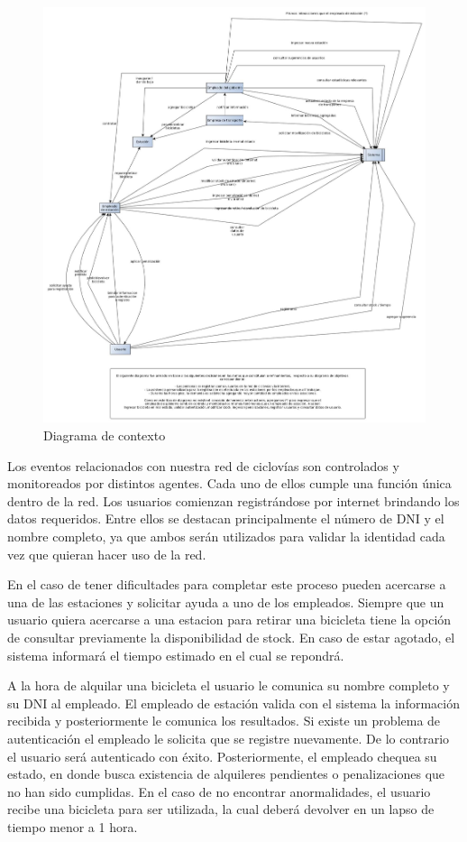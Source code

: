 \begin{figure}[H]
	\begin{center}
		  \includegraphics[scale=0.35]{diagrama_contexto.jpg}
		  \caption{Diagrama de contexto}
		  \label{fig:contra1}
	\end{center}
\end{figure}

Los eventos relacionados con nuestra red de ciclovías son controlados y monitoreados por distintos agentes. Cada uno de ellos cumple una función única dentro de la red.
Los usuarios comienzan registrándose por internet brindando los datos requeridos. Entre ellos se destacan principalmente el número de DNI y el nombre completo, ya que ambos serán utilizados
para validar la identidad cada vez que quieran hacer uso de la red. 

En el caso de tener dificultades para completar este proceso pueden acercarse a una de las estaciones y solicitar ayuda a uno de los empleados.
Siempre que un usuario quiera acercarse a una estacion para retirar una bicicleta tiene la opción de consultar previamente la disponibilidad de stock. En caso de estar agotado, el sistema informará el tiempo
estimado en el cual se repondrá.

A la hora de alquilar una bicicleta el usuario le comunica su nombre completo y su DNI al empleado. El empleado de estación valida con el sistema la información recibida y posteriormente le comunica
los resultados. Si existe un problema de autenticación el empleado le solicita que se registre nuevamente. De lo contrario el usuario será autenticado con éxito. Posteriormente, el empleado chequea 
su estado, en donde busca existencia de alquileres pendientes o penalizaciones que no han sido cumplidas. En el caso de no encontrar anormalidades, el usuario
recibe una bicicleta para ser utilizada, la cual deberá devolver en un lapso de tiempo menor a 1 hora.

